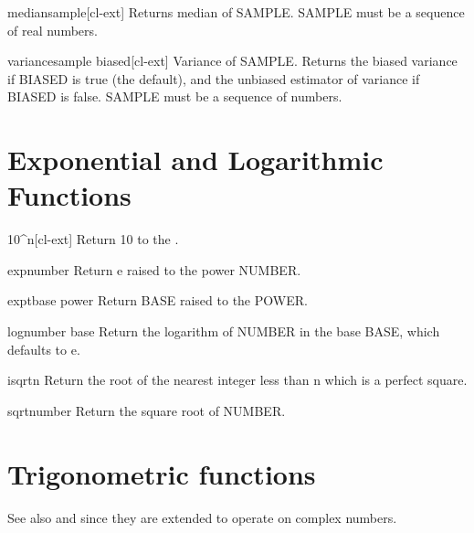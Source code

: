 \documentclass[10pt,english]{book}
\begin{document}
\begin{function}{median}{sample}[cl-ext]
  Returns median of SAMPLE. SAMPLE must be a sequence of real numbers.
\end{function}

\begin{function}{variance}{sample \key biased}[cl-ext]
  Variance of SAMPLE. Returns the biased variance if BIASED is true (the default),
and the unbiased estimator of variance if BIASED is false. SAMPLE must be a
sequence of numbers.
\end{function}

\section{Exponential and Logarithmic Functions}
\label{sec:expon-logar-funct}

\begin{function}[10caret]{10\^{}}{n}[cl-ext]
  Return 10 to the .
\end{function}

\begin{function}{exp}{number}
  Return e raised to the power NUMBER.
\end{function}

\begin{function}{expt}{base power}
  Return BASE raised to the POWER.
\end{function}

\begin{function}{log}{number \op base}
  Return the logarithm of NUMBER in the base BASE, which defaults to e.
\end{function}

\begin{function}{isqrt}{n}
  Return the root of the nearest integer less than n which is a perfect
   square.
\end{function}

\begin{function}{sqrt}{number}
  Return the square root of NUMBER.
\end{function}

\section{Trigonometric functions}
\label{sec:trig-funct}

See also  and  since they are extended to operate
on complex numbers.
\end{document}
